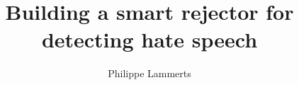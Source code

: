 \documentclass[whitelogo]{tudelft-report}
\begin{document}
\frontmatter


\title[tudelft-white]{\nohyphens{Building a smart rejector for detecting hate speech}}
\author[tudelft-white]{Philippe Lammerts}
\makecover[split]








\tableofcontents

\mainmatter












\appendix

%
\end{document}
